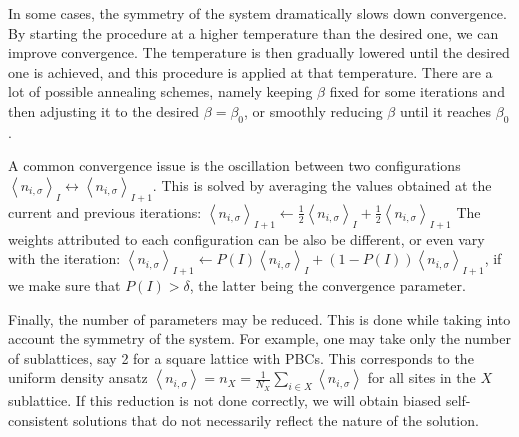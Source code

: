In some cases, the symmetry of the system dramatically slows down convergence.
By starting the procedure at a higher temperature than the desired one, we can improve convergence.
The temperature is then gradually lowered until the desired one is achieved, and this procedure is applied at that temperature.
There are a lot of possible annealing schemes, namely keeping $\beta$ fixed for some iterations and then adjusting it to the desired $\beta = \beta_0$, or smoothly reducing $\beta$ until it reaches $\beta_0$.

A common convergence issue is the oscillation between two configurations $\left\langle n_{i,\sigma}\right\rangle_I \leftrightarrow \left\langle n_{i,\sigma}\right\rangle_{I+1}$.
This is solved by averaging the values obtained at the current and previous iterations: $\left\langle n_{i,\sigma}\right\rangle_{I+1} \leftarrow \frac{1}{2} \left\langle n_{i,\sigma}\right\rangle_I + \frac{1}{2} \left\langle n_{i,\sigma}\right\rangle_{I+1}$
The weights attributed to each configuration can be also be different, or even vary with the iteration: $\left\langle n_{i,\sigma}\right\rangle_{I+1} \leftarrow P(I) \left\langle n_{i,\sigma}\right\rangle_I + (1 - P(I) ) \left\langle n_{i,\sigma}\right\rangle_{I+1}$, if we make sure that $P(I) > \delta$, the latter being the convergence parameter.

Finally, the number of parameters may be reduced.
This is done while taking into account the symmetry of the system.
For example, one may take only the number of sublattices, say 2 for a square lattice with \acp{PBC}.
This corresponds to the uniform density ansatz $\left\langle n_{i,\sigma} \right\rangle = n_X = \frac{1}{N_X} \sum_{i \in X} \left\langle n_{i,\sigma} \right\rangle$ for all sites in the $X$ sublattice.
If this reduction is not done correctly, we will obtain biased self-consistent solutions that do not necessarily reflect the nature of the solution.